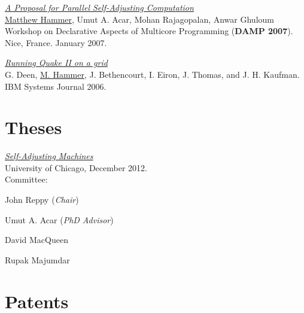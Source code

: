 \documentclass[10pt,letterpaper]{article}
\renewenvironment{itemize}{
  \begin{list}{}{
    \setlength{\leftmargin}{1.5em}
    \setlength{\itemsep}{0.25em}
    \setlength{\parskip}{0pt}
    \setlength{\parsep}{0.25em}
  }
}{
  \end{list}
}
\begin{document}
\begin{itemize}
\item
\href{http://www.cs.umd.edu/~hammer/papers/damp07.pdf}
{\textit{A Proposal for Parallel Self-Adjusting Computation}}
\\
\underline{Matthew Hammer}, Umut A. Acar, Mohan Rajagopalan, Anwar Ghuloum
\\
Workshop on Declarative Aspects of Multicore Programming (\textbf{DAMP 2007}).
\\
Nice, France. January 2007.

\item
\href{http://www.cs.umd.edu/~hammer/papers/ibmsj06quake.pdf}
{\textit{Running Quake II on a grid}}
\\
G. Deen, \underline{M. Hammer}, J. Bethencourt, I. Eiron, J. Thomas, and J. H. Kaufman.
\\
IBM Systems Journal 2006.

\end{itemize}

\section*{Theses}

\begin{itemize}
\item
\href{http://www.cs.umd.edu/~hammer/selfadjmachines}
{\textit{Self-Adjusting Machines}}
\\
University of Chicago, December 2012.
\\
Committee:
\begin{itemize}
\item John Reppy (\textit{Chair})
\item Umut A. Acar (\textit{PhD Advisor})
\item David MacQueen
\item Rupak Majumdar
\end{itemize}
\end{itemize}

\section*{Patents}
\end{document}
